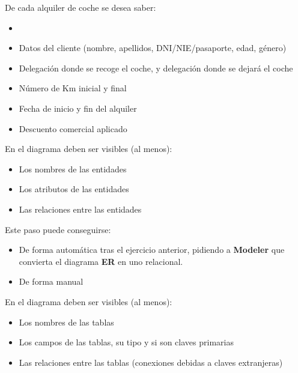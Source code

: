 De cada alquiler de coche se desea saber:
\begin{itemize}
\item
  
\item Datos del cliente (nombre, apellidos, DNI/NIE/pasaporte, edad,
género)
\item  Delegación donde se recoge el coche, y delegación donde se
dejará el coche
\item  Número de Km inicial y final
\item  Fecha de inicio y fin del alquiler
\item  Descuento comercial aplicado
\end{itemize}


\begin{homeworkProblem}
  En el diagrama deben ser visibles (al menos):
  \begin{itemize}
  \item Los nombres de las entidades
  \item Los atributos de las entidades
  \item Las relaciones entre las entidades
  \end{itemize}

\end{homeworkProblem}

\begin{homeworkProblem}
  Este paso puede conseguirse:
  \begin{itemize}
  \item De forma automática tras el ejercicio anterior, pidiendo a \textbf{Modeler} que convierta el diagrama \textbf{ER} en uno relacional.
  \item De forma manual
  \end{itemize}

  En el diagrama deben ser visibles (al menos):
  \begin{itemize}
  \item Los nombres de las tablas
  \item Los campos de las tablas, su tipo y si son claves primarias
  \item Las relaciones entre las tablas (conexiones debidas a claves extranjeras)  
  \end{itemize}
  
\end{homeworkProblem}


